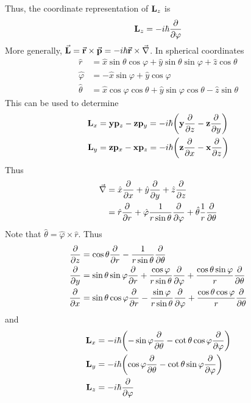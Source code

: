\documentclass[12pt,a4paper,titlepage]{article}
\begin{document}
Thus, the coordinate representation of $\vb{L}_{z}$ is
\begin{equation}
\vb{L}_{z}=-i\hbar\pdv{\varphi}
\end{equation}
More generally, $\vec{\vb{L}}=\vec{\vb{r}}\times\vec{\vb{p}}=-i\hbar\vec{\vb{r}}\times\vec{\nabla}$. In spherical coordinates
\begin{equation}
\begin{aligned}
\hat{r}&=\hat{x}\sin\theta\cos\varphi+\hat{y}\sin\theta\sin\varphi+\hat{z}\cos\theta\\
\hat{\varphi}&=-\hat{x}\sin\varphi+\hat{y}\cos\varphi\\
\hat{\theta}&=\hat{x}\cos\varphi\cos\theta+\hat{y}\sin\varphi\cos\theta-\hat{z}\sin\theta
\end{aligned}
\end{equation}
This can be used to determine
\begin{equation}
\begin{aligned}
\vb{L}_{x}&=\vb{y}\vb{p}_{z}-\vb{z}\vb{p}_{y}=-i\hbar\qty(\vb{y}\pdv{z}-\vb{z}\pdv{y})\\
\vb{L}_{y}&=\vb{z}\vb{p}_{x}-\vb{x}\vb{p}_{z}=-i\hbar\qty(\vb{z}\pdv{x}-\vb{x}\pdv{z})
\end{aligned}
\end{equation}
Thus
\begin{equation}
\begin{aligned}
\vec{\nabla}&=\hat{x}\pdv{x}+\hat{y}\pdv{y}+\hat{z}\pdv{z}\\
&=\hat{r}\pdv{r}+\hat{\varphi}\frac{1}{r\sin\theta}\pdv{\varphi}+\hat{\theta}\frac{1}{r}\pdv{\theta}
\end{aligned}
\end{equation}
Note that $\hat{\theta}=\hat{\varphi}\times\hat{r}$. Thus
\begin{equation}
\begin{aligned}
\pdv{z}&=\cos\theta\pdv{r}-\frac{1}{r\sin\theta}\pdv{\theta}\\
\pdv{y}&=\sin\theta\sin\varphi\pdv{r}+\frac{\cos\varphi}{r\sin\theta}\pdv{\varphi}+\frac{\cos\theta\sin\varphi}{r}\pdv{\theta}\\
\pdv{x}&=\sin\theta\cos\varphi\pdv{r}-\frac{\sin\varphi}{r\sin\theta}\pdv{\varphi}+\frac{\cos\theta\cos\varphi}{r}\pdv{\theta}
\end{aligned}
\end{equation}
and
\begin{equation}
\begin{aligned}
\vb{L}_{x}&=-i\hbar\qty(-\sin\varphi\pdv{\theta}-\cot\theta\cos\varphi\pdv{\varphi})\\
\vb{L}_{y}&=-i\hbar\qty(\cos\varphi\pdv{\theta}-\cot\theta\sin\varphi\pdv{\varphi})\\
\vb{L}_{z}&=-i\hbar\pdv{\varphi}
\end{aligned}
\end{equation}
\end{document}
